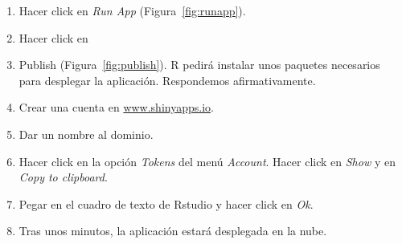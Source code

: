 \begin{enumerate}
	\item Hacer click en \textit{Run App} (Figura~\ref{fig:runapp}).
	
	\item Hacer click en \item{Publish} (Figura~\ref{fig:publish}). R pedirá instalar unos paquetes necesarios para desplegar la aplicación. Respondemos afirmativamente.
	
	\item Crear una cuenta en \url{www.shinyapps.io}.
	
	\item Dar un nombre al dominio.
	
	\item Hacer click en la opción \textit{Tokens} del menú \textit{Account}. Hacer click en \textit{Show} y en \textit{Copy to clipboard}.
	
	\item Pegar en el cuadro de texto de Rstudio y hacer click en \textit{Ok}.
	
	\item Tras unos minutos, la aplicación estará desplegada en la nube.
	
	
	
\end{enumerate}